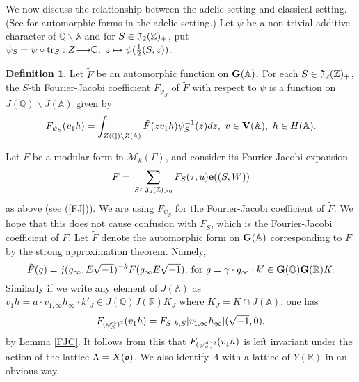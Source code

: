 \documentclass[11pt]{amsart}
\numberwithin{equation}{section}
\theoremstyle{definition}
\newtheorem{defin}[theorem]{Definition}
\begin{document}
We now discuss the relationship between the adelic setting and classical setting. (See \cite{borel&jacquet} for automorphic forms in the adelic setting.) 
Let $\psi$ be a non-trivial additive character of ${\mathbb{Q}}{\backslash}{\mathbb{A}}$ and 
for $S\in \frak J_2({\mathbb{Z}})_{+}$, put $\psi_S=\psi\circ {\rm tr}_S:Z{\longrightarrow} {\mathbb{C}},\ z\mapsto \psi(\frac{1}{2}(S,z))$. 
\begin{defin}\label{adelic-FJC}
Let $\tilde F$ be an automorphic function on $\bold{G}({\mathbb{A}})$. For each $S\in \frak J_2({\mathbb{Z}})_{+}$, the $S$-th Fourier-Jacobi 
coefficient $F_{\psi_S}$ of $\tilde F$ with respect to $\psi$ is a function on $J({\mathbb{Q}}){\backslash} J({\mathbb{A}})$ given by 
$$F_{\psi_S}(v_1h)=\int_{Z({\mathbb{Q}}){\backslash} Z({\mathbb{A}})} \tilde F(zv_1h)\psi^{-1}_S(z)dz,\ v\in \bold V({\mathbb{A}}),\ h\in H({\mathbb{A}}).$$
\end{defin}

Let $F$ be a modular form in $\mathcal{M}_{k}(\Gamma)$, and consider its Fourier-Jacobi expansion 
$$
F={\displaystyle}\sum_{S\in  \frak J_2({\mathbb{Z}})_{\ge 0}} F_S(\tau,u)\bold{e}((S,W))
$$ 
as above (see (\ref{FJ})). We are using $F_{\psi_S}$ for the Fourier-Jacobi coefficient of $\tilde F$. We hope that this does not cause confusion with $F_S$, which is the Fourier-Jacobi coefficient of $F$.
Let $\tilde F$ denote the automorphic form on $\bold{G}({\mathbb{A}})$ corresponding to $F$ by the strong approximation theorem. Namely, 
\begin{equation}\label{auto-form}
\tilde F(g)=j(g_\infty, E\sqrt{-1})^{-k}F(g_\infty E\sqrt{-1}),\: {\rm for}\  g=\gamma\cdot g_\infty\cdot k'\in \bold{G}({\mathbb{Q}})\bold{G}({\mathbb{R}})K.
\end{equation}
Similarly if we write any element of $J({\mathbb{A}})$ as $v_1h=a\cdot v_{1,\infty}h_\infty\cdot k'_J\in J({\mathbb{Q}})J({\mathbb{R}})K_J$ 
where $K_J=K\cap J({\mathbb{A}})$, 
one has 
$$F_{(\psi^{{\rm st}}_S)^2}(v_1h)=F_S|_{k,S}[v_{1,\infty}h_\infty](\sqrt{-1},0),
$$
by Lemma \ref{FJC}. 
It follows from this that 
$F_{(\psi^{{\rm st}}_S)^2}(v_1h)$ is left invariant under the action of the lattice $\Lambda=X(\frak o)$. 
We also identify $\Lambda$ with a lattice of $Y({\mathbb{R}})$ in an obvious way.
\end{document}
